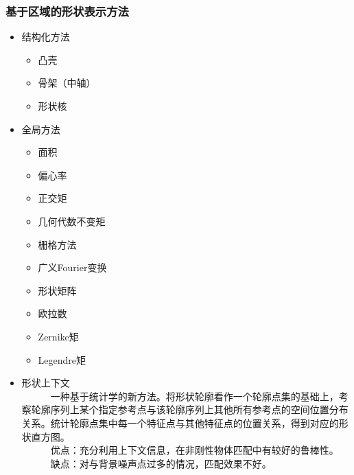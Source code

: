 \documentclass[notheorems,mathserif,table,compress]{beamer}  %
\begin{document}
\begin{frame}
\frametitle{基于区域的形状表示方法}
  \begin{itemize}
   \item 结构化方法
	\begin{itemize}
	 \item 凸壳
	 \item 骨架（中轴）
	 \item 形状核
	\end{itemize}
   \item 全局方法
	\begin{itemize}
	 \item 面积
	 \item 偏心率
	 \item 正交矩
	 \item 几何代数不变矩
	 \item 栅格方法
	 \item 广义Fourier变换
	 \item 形状矩阵
	 \item 欧拉数
	 \item Zernike矩
	 \item Legendre矩
	\end{itemize}
  \end{itemize}
\end{frame}

\begin{frame}
\begin{itemize}
\item 形状上下文\\ 
~~~~~~一种基于统计学的新方法。将形状轮廓看作一个轮廓点集的基础上，考察轮廓序列上某个指定参考点与该轮廓序列上其他所有参考点的空间位置分布关系。统计轮廓点集中每一个特征点与其他特征点的位置关系，得到对应的形状直方图。\\ 
~~~~~~优点：充分利用上下文信息，在非刚性物体匹配中有较好的鲁棒性。\\
~~~~~~缺点：对与背景噪声点过多的情况，匹配效果不好。 
\end{itemize}
\end{frame}
\end{document}
